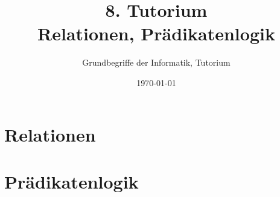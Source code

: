 




\title[Relationen, Prädikatenlogik]{8. Tutorium\\ Relationen, Prädikatenlogik}
\subtitle{Grundbegriffe der Informatik, Tutorium \hashtag\mytutnumber}
\date{\today}


\titleframe
\roadmap

%


\section{Relationen}


\section{Prädikatenlogik}



\section{}
\questionframe
\lastframe
{}
